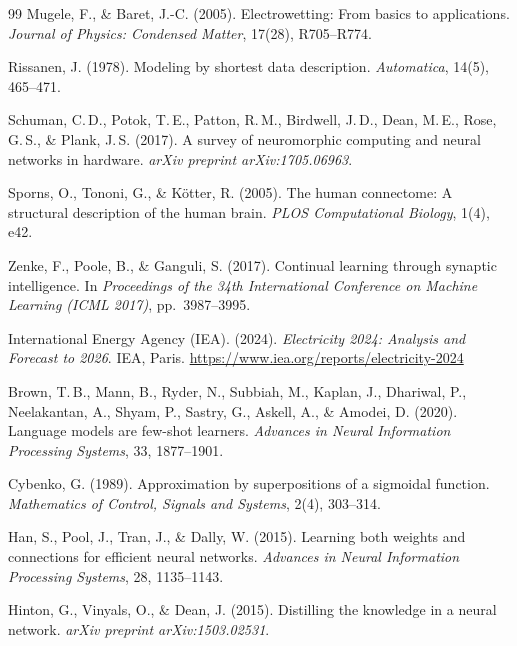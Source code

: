﻿\documentclass[12pt, a4paper, openany]{report}
\begin{document}
\begin{thebibliography}{99}
Mugele, F., \& Baret, J.-C. (2005).
Electrowetting: From basics to applications.
\textit{Journal of Physics: Condensed Matter}, 17(28), R705--R774.

Rissanen, J. (1978).
Modeling by shortest data description.
\textit{Automatica}, 14(5), 465--471.

Schuman, C.\,D., Potok, T.\,E., Patton, R.\,M., Birdwell, J.\,D., Dean,
M.\,E., Rose, G.\,S., \& Plank, J.\,S. (2017).
A survey of neuromorphic computing and neural networks in hardware.
\textit{arXiv preprint arXiv:1705.06963}.

Sporns, O., Tononi, G., \& K\"{o}tter, R. (2005).
The human connectome: A structural description of the human brain.
\textit{PLOS Computational Biology}, 1(4), e42.

Zenke, F., Poole, B., \& Ganguli, S. (2017).
Continual learning through synaptic intelligence.
In \textit{Proceedings of the 34th International Conference on Machine
Learning (ICML 2017)}, pp.~3987--3995.


International Energy Agency (IEA). (2024).
\textit{Electricity 2024: Analysis and Forecast to 2026}.
IEA, Paris.  \url{https://www.iea.org/reports/electricity-2024}


Brown, T.\,B., Mann, B., Ryder, N., Subbiah, M., Kaplan, J., Dhariwal, P.,
Neelakantan, A., Shyam, P., Sastry, G., Askell, A., \& Amodei, D. (2020).
Language models are few-shot learners.
\textit{Advances in Neural Information Processing Systems}, 33, 1877--1901.

Cybenko, G. (1989).
Approximation by superpositions of a sigmoidal function.
\textit{Mathematics of Control, Signals and Systems}, 2(4), 303--314.

Han, S., Pool, J., Tran, J., \& Dally, W. (2015).
Learning both weights and connections for efficient neural networks.
\textit{Advances in Neural Information Processing Systems}, 28, 1135--1143.

Hinton, G., Vinyals, O., \& Dean, J. (2015).
Distilling the knowledge in a neural network.
\textit{arXiv preprint arXiv:1503.02531}.


\end{thebibliography}
\end{document}

